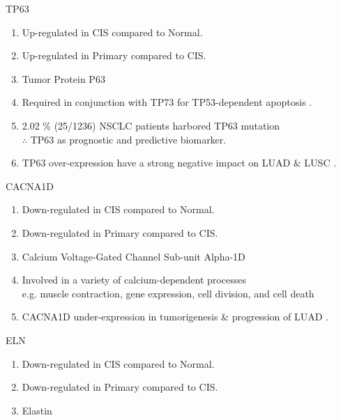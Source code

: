 \documentclass{beamer}
\begin{document}
\begin{frame}[allowframebreaks]
        \begin{block}{TP63}
            \begin{enumerate}
                \item Up-regulated in CIS compared to Normal.
                \item Up-regulated in Primary compared to CIS.
                \item Tumor Protein P63
                \item Required in conjunction with TP73 for TP53-dependent apoptosis \cite{TP63-1, TP63-2}.
                \item 2.02 \% (25/1236) NSCLC patients harbored TP63 mutation \cite{TP63-3} \\
                    $\therefore$ TP63 as prognostic and predictive biomarker.
                \item TP63 over-expression have a strong negative impact on LUAD \& LUSC \cite{TP63-4}.
            \end{enumerate}
        \end{block}

        \begin{block}{CACNA1D}
            \begin{enumerate}
                \item Down-regulated in CIS compared to Normal.
                \item Down-regulated in Primary compared to CIS.
                \item Calcium Voltage-Gated Channel Sub-unit Alpha-1D
                \item Involved in a variety of calcium-dependent processes \cite{CACNA1D-1} \\
                    e.g. muscle contraction, gene expression, cell division, and cell death
                \item CACNA1D under-expression in tumorigenesis \& progression of LUAD \cite{CACNA1D-2}.
            \end{enumerate}
        \end{block}

        \begin{block}{ELN}
            \begin{enumerate}
                \item Down-regulated in CIS compared to Normal.
                \item Down-regulated in Primary compared to CIS.
                \item Elastin
            \end{enumerate}
        \end{block}


\end{frame}
\end{document}
